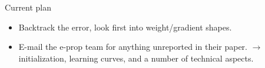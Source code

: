 \documentclass[t]{beamer}
\begin{document}
\begin{frame}{Current plan}
  \begin{itemize}[label=--]

    \item Backtrack the error, look first into weight/gradient shapes.
    \item E-mail the e-prop team for anything unreported in their paper.
    $\rightarrow$ initialization, learning curves, and a number of technical aspects.
  \end{itemize}
\end{frame}
\end{document}
